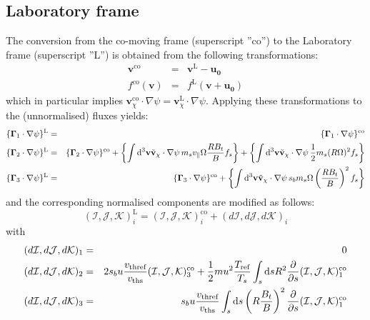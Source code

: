 \subsection{Laboratory frame}
The conversion from the co-moving frame (superscript ''co'') to the Laboratory frame (superscript ''L'') is obtained from the following transformations:
\begin{align}
 \mathbf{v}^\textrm{co} &=& \mathbf{v}^\textrm{L} -\mathbf{u_0}\\
 f^\textrm{co}(\mathbf{v}) &=& f^\textrm{L}(\mathbf{v}+\mathbf{u_0})
\end{align}
which in particular implies $\mathbf{v}_\chi^\textrm{co}\cdot \nabla \psi =\mathbf{v}_\chi^\textrm{L}\cdot \nabla \psi$. Applying these transformations to the (unnormalised) fluxes yields:
\begin{align}
\{\vec{\Gamma}_1 \cdot \nabla \psi\}^\textrm{L} &=& \{\vec{\Gamma}_1 \cdot \nabla \psi\}^\textrm{co} \\
\{\vec{\Gamma}_2 \cdot \nabla \psi\}^\textrm{L} &=& \{\vec{\Gamma}_2 \cdot \nabla \psi\}^\textrm{co} + \biggl \{ \int {\rm d}^3 {\bf v} \tilde {\bf v}_\chi\cdot \nabla \psi \, m_sv_\parallel\Omega\frac{RB_t}{B} f_s \biggr \} + \biggl \{ \int {\rm d}^3 {\bf v} \tilde {\bf v}_\chi\cdot \nabla \psi \, \frac{1}{2}m_s(R\Omega)^2 f_s \biggr \} \\
\{\vec{\Gamma}_3 \cdot \nabla \psi\}^\textrm{L} &=& \{\vec{\Gamma}_3 \cdot \nabla \psi\}^\textrm{co} + \biggl \{ \int {\rm d}^3 {\bf v} \tilde {\bf v}_\chi\cdot \nabla \psi \, s_bm_s\Omega\left(\frac{RB_t}{B}\right)^2 f_s \biggr \}
\end{align}
and the corresponding normalised components are modified as follows:
\begin{equation}
(\mathcal{I},\mathcal{J},\mathcal{K})_i^\textrm{L} = (\mathcal{I},\mathcal{J},\mathcal{K})_i^\textrm{co} + (d\mathcal{I},d\mathcal{J},d\mathcal{K})_i
\end{equation}
with
\begin{align}
(d\mathcal{I},d\mathcal{J},d\mathcal{K})_1 &=& 0 \\
(d\mathcal{I},d\mathcal{J},d\mathcal{K})_2 &=&  2s_bu\frac{v_\textrm{thref}}{v_\textrm{ths}}(\mathcal{I},\mathcal{J},\mathcal{K})_3^\textrm{co} + \frac{1}{2}m u^2\frac{T_\textrm{ref}}{T_s}\int_{s} {\rm d}s R^2 \frac{\partial }{\partial s}(\mathcal{I},\mathcal{J},\mathcal{K})_1^\textrm{co}\\
(d\mathcal{I},d\mathcal{J},d\mathcal{K})_3 &=& s_bu\frac{v_\textrm{thref}}{v_\textrm{ths}} \int_{s} {\rm d}s \left(R\frac{B_t}{B}\right)^2 \frac{\partial }{\partial s}(\mathcal{I},\mathcal{J},\mathcal{K})_1^\textrm{co} 
\end{align}

